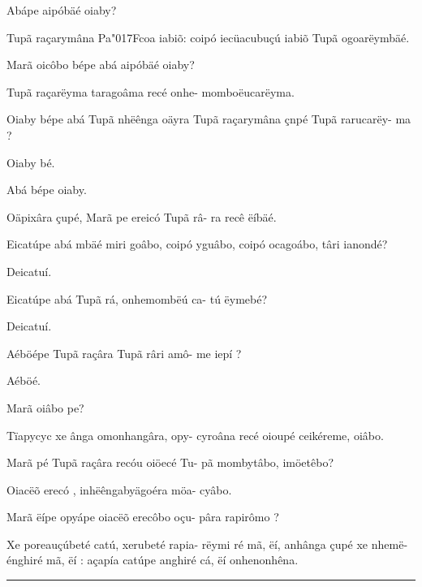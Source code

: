 \documentclass[openany,titlepage,12pt]{book}
\newcommand{\lgS}{\char"017F}
\begin{document}
\begin{alternate}
    \item Abápe aipóbäé oiaby?
    \item Tupã raçarymâna Pa\lgS coa iabiõ: coipó\linebreak
        iecüacubuçú iabiõ Tupã ogoarëymbäé.
    \item Marã oicôbo bépe abá aipóbäé oiaby?
    \item Tupã raçarëyma taragoâma recé onhe-\linebreak
        momboëucarëyma.
    \item Oiaby bépe abá Tupã nhëênga oäyra\linebreak
        Tupã raçarymâna çnpé Tupã rarucarëy-\linebreak
        ma ?
    \item Oiaby bé.
    \item Abá bépe oiaby.
    \item Oäpixâra çupé, Marã pe ereicó Tupã râ-\linebreak
        ra recê ëíbäé.
    \item Eicatúpe abá mbäé miri goâbo, coipó\linebreak
        yguâbo, coipó ocagoábo, târi ianondé?
    \item Deicatuí.
    \item Eicatúpe abá Tupã rá, onhemombëú ca-
        tú ëymebé?
    \item Deicatuí.
    \item Aéböépe Tupã raçâra Tupã râri amô-\linebreak
        me iepí ?
    \item Aéböé.
    \item Marã oiâbo pe?
    \item Tïapycyc xe ânga omonhangâra, opy-
        cyroâna recé oioupé ceikéreme, oiâbo.
    \item Marã pé Tupã raçâra recóu oiöecé Tu-
        pã mombytâbo, imöetêbo?
    \item Oiacëõ erecó , inhëêngabyägoéra möa-
        cyâbo.
    \item  Marã ëípe opyápe oiacëõ erecôbo oçu-
        pâra rapirômo ?
    \item Xe poreauçúbeté catú, xerubeté rapia-
        rëymi ré mã, ëí, anhânga çupé xe nhemë-
        énghiré mã, ëí : açapía catúpe anghiré cá,
        ëí onhenonhêna.
\end{alternate}
\newpage

\vspace{2pt}
\par\noindent\rule{\textwidth}{0.4pt}
\unskip\vspace*{2pt}
\end{document}
